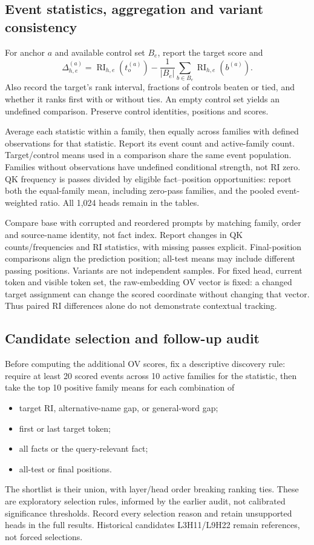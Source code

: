 \subsection{Event statistics, aggregation and variant consistency}

For anchor $a$ and available control set $B_e$, report the target score and
\begin{equation}
\Delta_{h,e}^{(a)}=
\operatorname{RI}_{h,e}(t_o^{(a)})-
\frac{1}{|B_e|}\sum_{b\in B_e}\operatorname{RI}_{h,e}(b^{(a)}).
\end{equation}
Also record the target's rank interval, fractions of controls beaten or tied, and whether it ranks first with or without ties. An empty control set yields an undefined comparison. Preserve control identities, positions and scores.

Average each statistic within a family, then equally across families with defined observations for that statistic. Report its event count and active-family count. Target/control means used in a comparison share the same event population. Families without observations have undefined conditional strength, not RI zero. QK frequency is passes divided by eligible fact--position opportunities: report both the equal-family mean, including zero-pass families, and the pooled event-weighted ratio. All 1,024 heads remain in the tables.

Compare base with corrupted and reordered prompts by matching family, order and source-name identity, not fact index. Report changes in QK counts/frequencies and RI statistics, with missing passes explicit. Final-position comparisons align the prediction position; all-test means may include different passing positions. Variants are not independent samples. For fixed head, current token and visible token set, the raw-embedding OV vector is fixed: a changed target assignment can change the scored coordinate without changing that vector. Thus paired RI differences alone do not demonstrate contextual tracking.

\subsection{Candidate selection and follow-up audit}

Before computing the additional OV scores, fix a descriptive discovery rule: require at least 20 scored events across 10 active families for the statistic, then take the top 10 positive family means for each combination of
\begin{itemize}[itemsep=1pt]
\item target RI, alternative-name gap, or general-word gap;
\item first or last target token;
\item all facts or the query-relevant fact;
\item all-test or final positions.
\end{itemize}
The shortlist is their union, with layer/head order breaking ranking ties. These are exploratory selection rules, informed by the earlier audit, not calibrated significance thresholds. Record every selection reason and retain unsupported heads in the full results. Historical candidates L3H11/L9H22 remain references, not forced selections.

